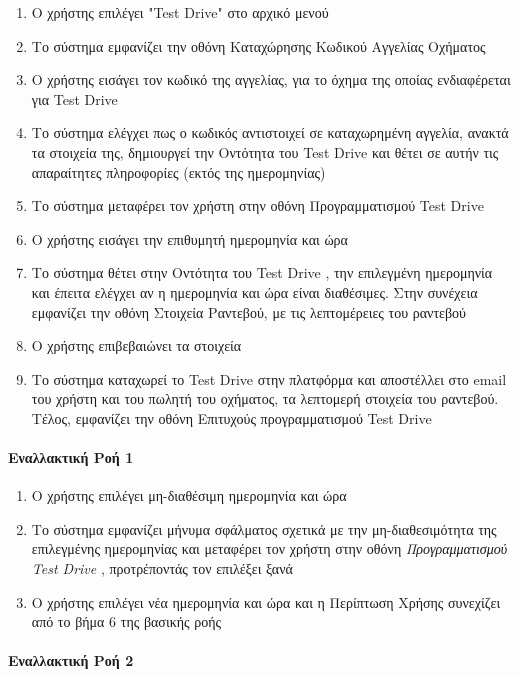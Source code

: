 \documentclass{../ol-softwaremanual}
\begin{document}
		\begin{enumerate}
		\item Ο χρήστης επιλέγει \en"Test Drive" \gr στο αρχικό μενού
		\item Το σύστημα εμφανίζει την οθόνη Καταχώρησης Κωδικού Αγγελίας Οχήματος
		\item Ο χρήστης εισάγει τον κωδικό της αγγελίας, για το όχημα της οποίας ενδιαφέρεται για \en Test Drive \gr
		\item Το σύστημα ελέγχει πως ο κωδικός αντιστοιχεί σε καταχωρημένη αγγελία, ανακτά τα στοιχεία της,  
		δημιουργεί την Οντότητα του \en Test Drive \gr και θέτει σε αυτήν τις απαραίτητες πληροφορίες (εκτός της ημερομηνίας)
		\item Το σύστημα μεταφέρει τον χρήστη στην οθόνη Προγραμματισμού \en Test Drive \gr 
		\item Ο χρήστης εισάγει την επιθυμητή ημερομηνία και ώρα		
		\item Το σύστημα θέτει στην Οντότητα του \en Test Drive \gr, την επιλεγμένη ημερομηνία και έπειτα ελέγχει αν η ημερομηνία και ώρα είναι διαθέσιμες. Στην συνέχεια εμφανίζει την οθόνη Στοιχεία Ραντεβού, με τις λεπτομέρειες του ραντεβού
		\item Ο χρήστης επιβεβαιώνει τα στοιχεία
		\item Το σύστημα καταχωρεί το \en Test Drive \gr στην πλατφόρμα και αποστέλλει στο \en email \gr του χρήστη και του πωλητή του οχήματος, τα λεπτομερή στοιχεία του ραντεβού. Τέλος, εμφανίζει την οθόνη Επιτυχούς προγραμματισμού \en Test Drive \gr 
	\end{enumerate}
	
	\paragraph{Εναλλακτική Ροή 1}
	
	\begin{enumerate}
		\item Ο χρήστης επιλέγει μη-διαθέσιμη ημερομηνία και ώρα
		\item Το σύστημα εμφανίζει μήνυμα σφάλματος σχετικά με την μη-διαθεσιμότητα της επιλεγμένης ημερομηνίας και μεταφέρει τον χρήστη στην οθόνη \textit{Προγραμματισμού \en Test Drive \gr}, προτρέποντάς τον επιλέξει ξανά
		\item Ο χρήστης επιλέγει νέα ημερομηνία και ώρα και η Περίπτωση Χρήσης συνεχίζει από το βήμα 6 της βασικής ροής
	\end{enumerate}
	
	
	\paragraph{Εναλλακτική Ροή 2}
	
\end{document}
